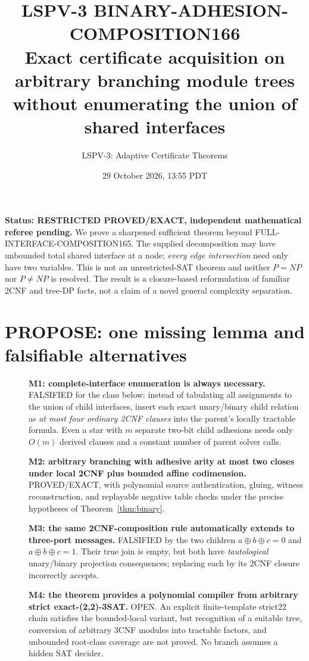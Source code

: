 \documentclass[11pt]{article}
\title{LSPV-3 BINARY-ADHESION-COMPOSITION166\\
\large Exact certificate acquisition on arbitrary branching module trees\newline
without enumerating the union of shared interfaces}
\author{LSPV-3: Adaptive Certificate Theorems}
\date{29 October 2026, 13:55 PDT}
\begin{document}
\maketitle
\noindent\textbf{Status: RESTRICTED PROVED/EXACT, independent mathematical referee pending.}
We prove a sharpened sufficient theorem beyond FULL-INTERFACE-COMPOSITION165.
The supplied decomposition may have unbounded total shared interface at a node;
\emph{every edge intersection} need only have two variables. This is not an
unrestricted-SAT theorem and neither $P=NP$ nor $P\ne NP$ is resolved.
The result is a closure-based reformulation of familiar 2CNF and tree-DP facts,
not a claim of a novel general complexity separation.

\section{PROPOSE: one missing lemma and falsifiable alternatives}
\begin{description}
\item[]\textbf{M1: complete-interface enumeration is always necessary.}
FALSIFIED for the class below: instead of tabulating all assignments to the
union of child interfaces, insert each exact unary/binary child relation as
\emph{at most four ordinary 2CNF clauses} into the parent's locally tractable
formula. Even a star with $m$ separate two-bit child adhesions needs only
$O(m)$ derived clauses and a constant number of parent solver calls.
\item[]\textbf{M2: arbitrary branching with adhesive arity at most two closes
under local 2CNF plus bounded affine codimension.}
PROVED/EXACT, with polynomial source authentication, gluing, witness
reconstruction, and replayable negative table checks under the precise
hypotheses of Theorem~\ref{thm:binary}.
\item[]\textbf{M3: the same 2CNF-composition rule automatically extends to
three-port messages.}
FALSIFIED by the two children $a\oplus b\oplus c=0$ and
$a\oplus b\oplus c=1$. Their true join is empty, but both have
\emph{tautological} unary/binary projection consequences; replacing each by
its 2CNF closure incorrectly accepts.
\item[]\textbf{M4: the theorem provides a polynomial compiler from arbitrary
strict exact-(2,2)-3SAT.}
OPEN. An explicit finite-template strict22 chain satisfies the bounded-local
variant, but recognition of a suitable tree, conversion of arbitrary 3CNF
modules into tractable factors, and unbounded root-class coverage are not
proved. No branch assumes a hidden SAT decider.
\end{description}
\end{document}
